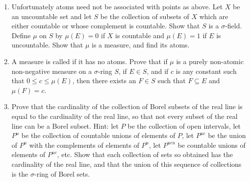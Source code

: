 \begin{enumerate}[label=\arabic*),ref=\arabic*]
\item Unfortunately atoms need not be associated with points as above. Let $X$ be an uncountable set and let $S$ be the collection of subsets of $X$ which are either countable or whose complement is countable. Show that $S$ is a $\sigma$-field. Define $\mu$ on $S$ by $\mu(E)=0$ if $X$ is countable and $\mu(E)=1$ if $E$ is uncountable. Show that $\mu$ is a measure, and find its atoms.

\item\label{exer:non atomic measure}
A measure is called  if it has no atoms. Prove that if $\mu$ is a purely non-atomic non-negative measure on a $\sigma$-ring $S$, if $E\in S$, and if $c$ is any constant such that $0\leq c\leq\mu(E)$, then there exists an $F\in S$ such that $F\subseteq E$ and $\mu(F)=c$.

\item\label{exer:construct borel for reals}
Prove that the cardinality of the collection of Borel subsets of the real line is equal to the cardinality of the real line, so that not every subset of the real line can be a Borel subset. Hint: let $P$ be the collection of open intervals, let $P^u$ be the collection of countable unions of elements of $P$, let $P^{uc}$ be the union of $P^u$ with the complements of elements of $P^u$, let $P^{ucu}$ be countable unions of elements of $P^{uc}$, etc. Show that each collection of sets so obtained has the cardinality of the real line, and that the union of this sequence of collections is the $\sigma$-ring of Borel sets.


\end{enumerate}

